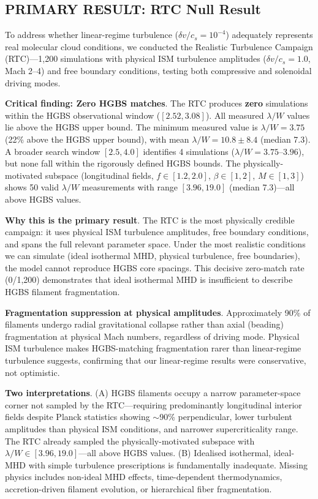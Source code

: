 \documentclass[twocolumn,longtitle,usenatbib]{mnras}
\begin{document}
\subsection{PRIMARY RESULT: RTC Null Result}
\label{sec:rtc_primary}

To address whether linear-regime turbulence ($\delta v/c_s = 10^{-4}$) adequately represents real molecular cloud conditions, we conducted the Realistic Turbulence Campaign (RTC)---1,200 simulations with physical ISM turbulence amplitudes ($\delta v/c_s = 1.0$, Mach 2--4) and free boundary conditions, testing both compressive and solenoidal driving modes.

\textbf{Critical finding: Zero HGBS matches}. The RTC produces \textbf{zero} simulations within the HGBS observational window ($[2.52, 3.08]$). All measured $\lambda/W$ values lie above the HGBS upper bound. The minimum measured value is $\lambda/W = 3.75$ (22\% above the HGBS upper bound), with mean $\lambda/W = 10.8 \pm 8.4$ (median 7.3). A broader search window $[2.5, 4.0]$ identifies 4 simulations ($\lambda/W = 3.75$--$3.96$), but none fall within the rigorously defined HGBS bounds. The physically-motivated subspace (longitudinal fields, $f \in [1.2, 2.0]$, $\beta \in [1, 2]$, $M \in [1, 3]$) shows 50 valid $\lambda/W$ measurements with range $[3.96, 19.0]$ (median 7.3)—all above HGBS values.

\textbf{Why this is the primary result}. The RTC is the most physically credible campaign: it uses physical ISM turbulence amplitudes, free boundary conditions, and spans the full relevant parameter space. Under the most realistic conditions we can simulate (ideal isothermal MHD, physical turbulence, free boundaries), the model cannot reproduce HGBS core spacings. This decisive zero-match rate (0/1,200) demonstrates that ideal isothermal MHD is insufficient to describe HGBS filament fragmentation.

\textbf{Fragmentation suppression at physical amplitudes}. Approximately 90\% of filaments undergo radial gravitational collapse rather than axial (beading) fragmentation at physical Mach numbers, regardless of driving mode. Physical ISM turbulence makes HGBS-matching fragmentation rarer than linear-regime turbulence suggests, confirming that our linear-regime results were conservative, not optimistic.

\textbf{Two interpretations}. (A) HGBS filaments occupy a narrow parameter-space corner not sampled by the RTC---requiring predominantly longitudinal interior fields despite Planck statistics showing $\sim$90\% perpendicular, lower turbulent amplitudes than physical ISM conditions, and narrower supercriticality range. The RTC already sampled the physically-motivated subspace with $\lambda/W \in [3.96, 19.0]$---all above HGBS values. (B) Idealised isothermal, ideal-MHD with simple turbulence prescriptions is fundamentally inadequate. Missing physics includes non-ideal MHD effects, time-dependent thermodynamics, accretion-driven filament evolution, or hierarchical fiber fragmentation.
\end{document}

